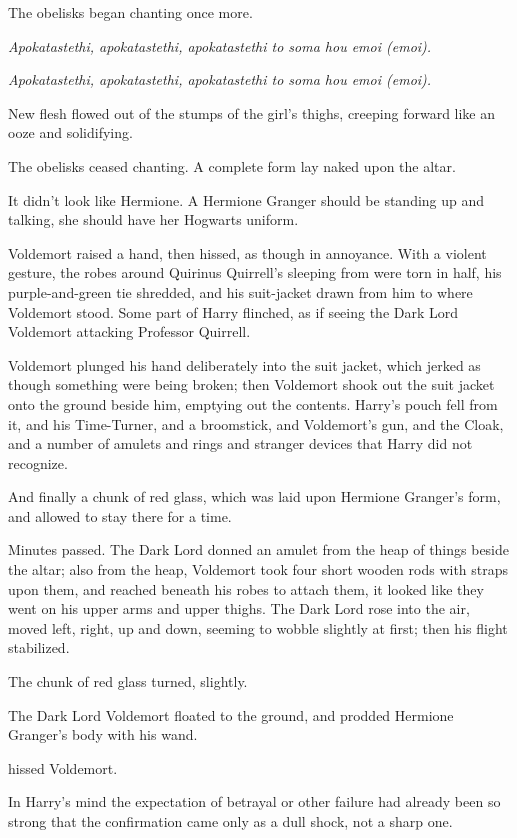 The obelisks began chanting once more.

\emph{Apokatastethi, apokatastethi, apokatastethi to soma hou emoi (emoi).}

\emph{Apokatastethi, apokatastethi, apokatastethi to soma hou emoi (emoi).}

New flesh flowed out of the stumps of the girl's thighs, creeping forward like
an ooze and solidifying.

The obelisks ceased chanting. A complete form lay naked upon the altar.

It didn't look like Hermione. A Hermione Granger should be standing up and
talking, she should have her Hogwarts uniform.

Voldemort raised a hand, then hissed, as though in annoyance. With a violent
gesture, the robes around Quirinus Quirrell's sleeping from were torn in half,
his purple-and-green tie shredded, and his suit-jacket drawn from him to where
Voldemort stood. Some part of Harry flinched, as if seeing the Dark Lord
Voldemort attacking Professor Quirrell.

Voldemort plunged his hand deliberately into the suit jacket, which jerked as
though something were being broken; then Voldemort shook out the suit jacket
onto the ground beside him, emptying out the contents. Harry's pouch fell from
it, and his Time-Turner, and a broomstick, and Voldemort's gun, and the Cloak,
and a number of amulets and rings and stranger devices that Harry did not
recognize.

And finally a chunk of red glass, which was laid upon Hermione Granger's form,
and allowed to stay there for a time.

Minutes passed. The Dark Lord donned an amulet from the heap of things beside
the altar; also from the heap, Voldemort took four short wooden rods with
straps upon them, and reached beneath his robes to attach them, it looked like
they went on his upper arms and upper thighs. The Dark Lord rose into the air,
moved left, right, up and down, seeming to wobble slightly at first; then his
flight stabilized.

The chunk of red glass turned, slightly.

The Dark Lord Voldemort floated to the ground, and prodded Hermione Granger's
body with his wand.

 hissed Voldemort.

In Harry's mind the expectation of betrayal or other failure had already been
so strong that the confirmation came only as a dull shock, not a sharp one.

